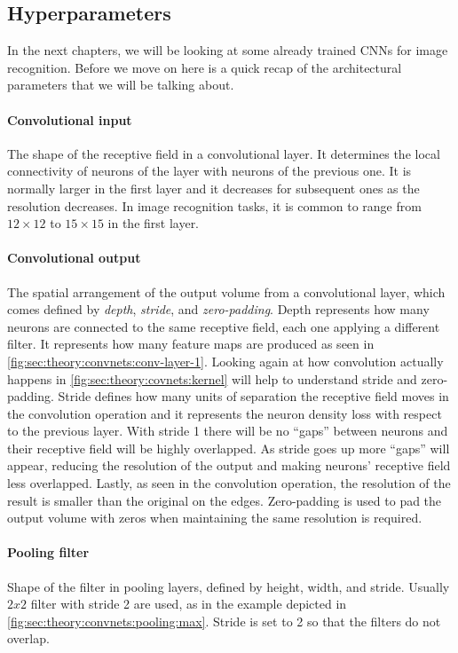 \subsection{Hyperparameters}
\label{sub:theory:convnets:achitecture}

In the next chapters, we will be looking at some already trained CNNs for image recognition.
Before we move on here is a quick recap of the architectural parameters that we will be talking about.

\paragraph{Convolutional input}
The shape of the receptive field in a convolutional layer.
It determines the local connectivity of neurons of the layer with neurons of the previous one.
It is normally larger in the first layer and it decreases for subsequent ones as the resolution decreases.
In image recognition tasks, it is common to range from ${12}\times{12}$ to ${15}\times{15}$ in the first layer.

\paragraph{Convolutional output}
The spatial arrangement of the output volume from a convolutional layer, which comes defined by \emph{depth}, \emph{stride}, and \emph{zero-padding}.
Depth represents how many neurons are connected to the same receptive field, each one applying a different filter.
It represents how many feature maps are produced as seen in \autoref{fig:sec:theory:convnets:conv-layer-1}.
Looking again at how convolution actually happens in \autoref{fig:sec:theory:covnets:kernel} will help to understand stride and zero-padding.
Stride defines how many units of separation the receptive field moves in the convolution operation and it represents the neuron density loss with respect to the previous layer.
With stride 1 there will be no ``gaps'' between neurons and their receptive field will be highly overlapped.
As stride goes up more ``gaps'' will appear, reducing the resolution of the output and making neurons' receptive field less overlapped.
Lastly, as seen in the convolution operation, the resolution of the result is smaller than the original on the edges.
Zero-padding is used to pad the output volume with zeros when maintaining the same resolution is required.

\paragraph{Pooling filter}
Shape of the filter in pooling layers, defined by height, width, and stride.
Usually $2x2$ filter with stride 2 are used, as in the example depicted in \autoref{fig:sec:theory:convnets:pooling:max}.
Stride is set to 2 so that the filters do not overlap.

